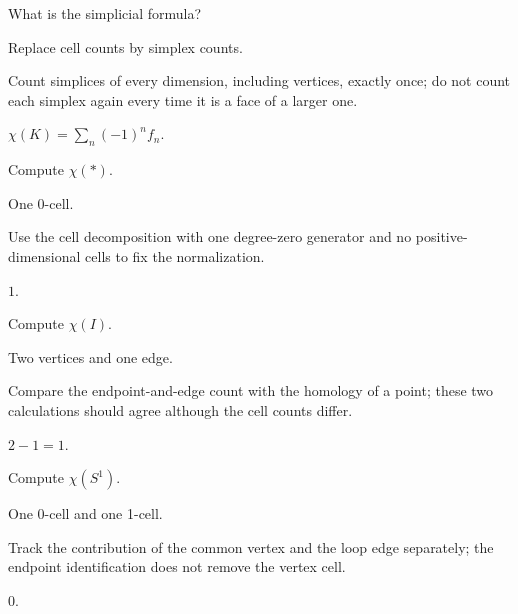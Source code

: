 \begin{exercise}\label{exr:viii21-02}
What is the simplicial formula?
\end{exercise}
\begin{hint}
Replace cell counts by simplex counts.

Count simplices of every dimension, including vertices, exactly once; do not count each simplex again every time it is a face of a larger one.
\end{hint}
\begin{solution}
\(\chi(K)=\sum_n(-1)^nf_n\).
\end{solution}

\begin{exercise}\label{exr:viii21-03}
Compute \(\chi(*)\).
\end{exercise}
\begin{hint}
One 0-cell.

Use the cell decomposition with one degree-zero generator and no positive-dimensional cells to fix the normalization.
\end{hint}
\begin{solution}
\(1\).
\end{solution}

\begin{exercise}\label{exr:viii21-04}
Compute \(\chi(I)\).
\end{exercise}
\begin{hint}
Two vertices and one edge.

Compare the endpoint-and-edge count with the homology of a point; these two calculations should agree although the cell counts differ.
\end{hint}
\begin{solution}
\(2-1=1\).
\end{solution}

\begin{exercise}\label{exr:viii21-05}
Compute \(\chi(S^1)\).
\end{exercise}
\begin{hint}
One 0-cell and one 1-cell.

Track the contribution of the common vertex and the loop edge separately; the endpoint identification does not remove the vertex cell.
\end{hint}
\begin{solution}
\(0\).
\end{solution}

